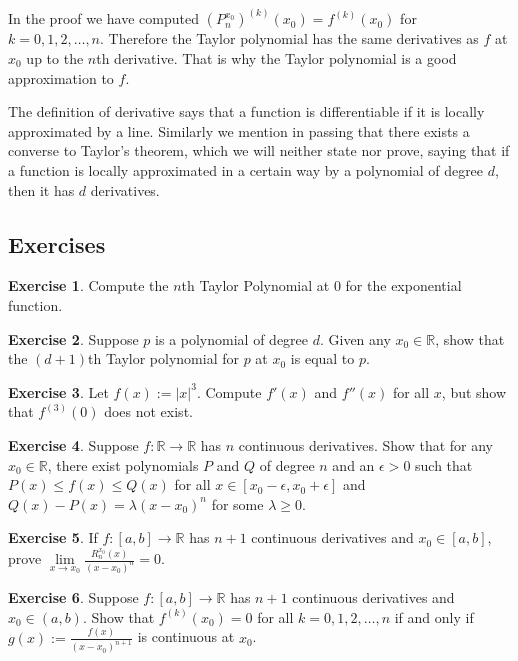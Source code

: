 \documentclass[12pt]{book}
\newcommand{\abs}[1]{\left\lvert {#1} \right\rvert}
\newcommand{\R}{{\mathbb{R}}}
\theoremstyle{plain}
\theoremstyle{remark}
\theoremstyle{definition}
\theoremstyle{exercise}
\newtheorem{exercise}{Exercise}[section]
\theoremstyle{example}
\begin{document}
In the proof we have computed 
${(P_n^{x_0})}^{(k)}(x_0) = f^{(k)}(x_0)$ for $k=0,1,2,\ldots,n$.
Therefore the Taylor polynomial has the same derivatives as $f$ at $x_0$
up to the $n$th derivative.  That is why the Taylor polynomial is
a good approximation to $f$.

The definition of derivative says that
a function is
differentiable if it
is locally approximated by a line.
Similarly we mention in passing that there exists a converse to Taylor's
theorem,
which we will neither state nor prove,
saying that if a function is
locally approximated in a certain way by a polynomial of degree $d$, then it
has $d$ derivatives.

\subsection{Exercises}

\begin{exercise}
Compute the $n$th Taylor Polynomial at $0$ for the exponential function.
\end{exercise}

\begin{exercise}
Suppose $p$ is a polynomial of degree $d$.  Given any $x_0 \in \R$,
show that
the $(d+1)$th Taylor polynomial for $p$ at $x_0$ is equal to $p$.
\end{exercise}

\begin{exercise}
Let $f(x) := \abs{x}^3$.  Compute $f'(x)$ and $f''(x)$ for all $x$,
but show that $f^{(3)}(0)$ does not exist.
\end{exercise}

\begin{exercise}
Suppose $f \colon \R \to \R$ has $n$ continuous derivatives.  Show
that for any $x_0 \in \R$,
there exist polynomials $P$ and $Q$ of degree $n$ and 
an $\epsilon > 0$ such that $P(x) \leq f(x) \leq Q(x)$ for all $x \in
[x_0-\epsilon,x_0+\epsilon]$  and
$Q(x)-P(x) = \lambda {(x-x_0)}^n$ for some $\lambda \geq 0$.
\end{exercise}

\begin{exercise}
If $f \colon [a,b] \to \R$ has $n+1$ continuous derivatives
and $x_0 \in [a,b]$,
prove
$\lim\limits_{x\to x_0} \frac{R_n^{x_0}(x)}{{(x-x_0)}^n} = 0$.
\end{exercise}

\begin{exercise}
Suppose $f \colon [a,b] \to \R$ has $n+1$ continuous derivatives
and $x_0 \in (a,b)$.
Show that $f^{(k)}(x_0) = 0$ for all $k = 0, 1, 2, \ldots, n$
if and only if $g(x) := \frac{f(x)}{{(x-x_0)}^{n+1}}$ is continuous at $x_0$.
\end{exercise}
\end{document}
